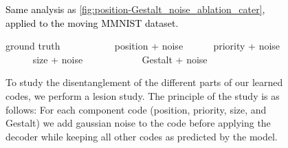 \documentclass{article} \usepackage{iclr2023_conference_arxiv,times}
\def\imagepaddingtiny{0.1cm}
\newcommand{\changed}{\textcolor{black}}
\begin{document}
\begin{figure}[htb!]
    \centering
    \begin{elasticrow}[\imagepaddingtiny]
    \end{elasticrow}
    \caption{\changed{Same analysis as \autoref{fig:position-Gestalt_noise_ablation_cater}, applied to the moving MMNIST dataset.}}
    \label{fig:position-Gestalt_noise_ablation_mmnist}
\end{figure}

\begin{figure}[htb!]
    \raggedright{
    ground truth ~~~~~~~~~~
position + noise ~~~~~ 
    priority + noise ~~~~~
    size + noise ~~~~~~~~~~~
    Gestalt + noise ~~~}
    \begin{elasticrow}[\imagepaddingtiny]
    \end{elasticrow}

    \caption{To study the disentanglement of the different parts of our learned codes, we perform a lesion study. The principle of the study is as follows: For each component code (position, priority, size, and Gestalt) we add gaussian noise to the code before applying the decoder while keeping all other codes as predicted by the model.} 
    \label{fig:clevrer_prediction2}
\end{figure}
\end{document}

